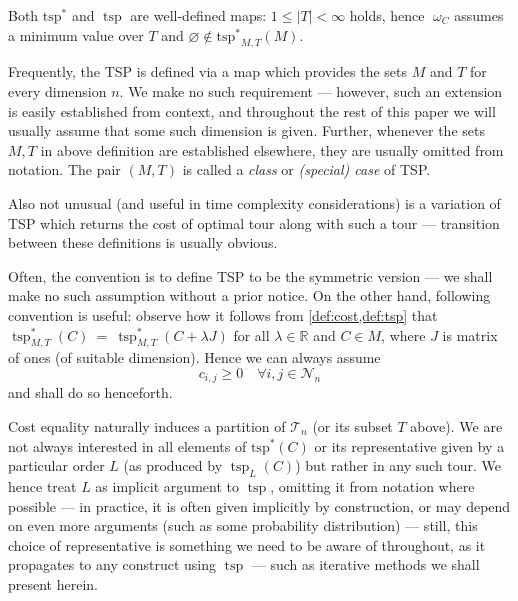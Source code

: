 \documentclass[index=totoc,bibliography=totoc]{scrartcl}
\numberwithin{equation}{section}
\numberwithin{figure}{section}
\numberwithin{table}{section}
\let\defstyle\itshape
\begin{document}
\begin{remark}
  Both $\operatorname{tsp^\ast}$ and $\operatorname{tsp}$ are well-defined maps:
  $1 \leq \left|T\right| < \infty$ holds, hence $\;\omega_C$ assumes a minimum
  value over $T$ and $\varnothing \notin \operatorname{tsp^\ast}_{M,T}\left(M\right)$.
\end{remark}

\begin{remark}
Frequently, the TSP is defined via a map which provides the sets $M$ and
$T$ for every dimension $n$.  We make no such requirement --- however, such
an extension is easily established from context, and throughout the rest of
this paper we will usually assume that some such dimension is given.
Further, whenever the sets $M,T$ in above definition are established elsewhere,
they are usually omitted from notation.  The pair $(M,T)$ is called a
{\defstyle class} or {\defstyle (special) case} of TSP.
\end{remark}

\begin{remark}
  Also not unusual (and useful in time complexity considerations) is a
  variation of TSP which returns the cost of optimal tour along with
  such a tour --- transition between these definitions is usually obvious.
\end{remark}

\begin{remark}
Often, the convention is to define TSP to be the symmetric version
--- we shall make no such assumption without a prior notice.
On the other hand, following convention is useful:
observe how it follows from \cref{def:cost,def:tsp} that
$\operatorname{tsp}_{M,T}^\ast\left(C\right) ~ = ~
 \operatorname{tsp}_{M,T}^\ast\left(C + \lambda J\right)$
for all $\lambda \in \mathbb{R}$ and $C \in M$,
where $J$ is matrix of ones (of suitable dimension).
Hence we can always assume
\[
  c_{i,j} \geq 0 \quad \forall i,j \in \mathcal{N}_n
\]
and shall do so henceforth.
\end{remark}

\begin{remark}
\label{rem:order}
  Cost equality naturally induces a partition of $\mathcal{T}_n$ (or its
  subset $T$ above).  We are not always interested in all elements of
  $\operatorname{tsp^\ast}\left(C\right)$ or its representative given by a
  particular order $L$ (as produced by $\operatorname{tsp}_L\left(C\right)$)
  but rather in any such tour.
  We hence treat $L$ as implicit argument
  to $\operatorname{tsp}$, omitting it from notation where possible ---
  in practice, it is often given implicitly by construction, or may depend
  on even more arguments (such as some probability distribution) ---
  still, this choice of representative is something we need to be aware of
  throughout, as it propagates to any construct using $\operatorname{tsp}$ ---
  such as iterative methods we shall present herein.
\end{remark}
\end{document}
